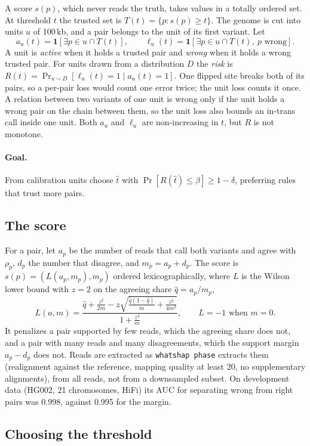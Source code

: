 \documentclass[11pt]{article}
\theoremstyle{definition}
\theoremstyle{remark}
\begin{document}
A score $s(p)$, which never reads the truth, takes values in a totally
ordered set. At threshold $t$ the trusted set is $T(t)=\{p:s(p)\ge t\}$. The
genome is cut into units $u$ of 100\,kb, and a pair belongs to the unit of
its first variant. Let
\[
a_u(t)=\mathbf{1}[\exists p\in u\cap T(t)],\qquad
\ell_u(t)=\mathbf{1}[\exists p\in u\cap T(t),\ p\text{ wrong}].
\]
A unit is \emph{active} when it holds a trusted pair and \emph{wrong} when it
holds a wrong trusted pair. For units drawn from a distribution $D$ the
\emph{risk} is $R(t)=\Pr_{u\sim D}[\ell_u(t)=1\mid a_u(t)=1]$. One flipped
site breaks both of its pairs, so a per-pair loss would count one error
twice; the unit loss counts it once. A relation between two variants of one
unit is wrong only if the unit holds a wrong pair on the chain between them,
so the unit loss also bounds an in-trans call inside one unit. Both $a_u$
and $\ell_u$ are non-increasing in $t$, but $R$ is not monotone.

\paragraph{Goal.} From calibration units choose $\hat t$ with
$\Pr[R(\hat t)\le\beta]\ge1-\delta$, preferring rules that trust more pairs.

\subsection{The score}\label{sec:score}

For a pair, let $a_p$ be the number of reads that call both variants and
agree with $\rho_p$, $d_p$ the number that disagree, and $m_p=a_p+d_p$. The
score is $s(p)=(L(a_p,m_p),m_p)$ ordered lexicographically, where $L$ is the
Wilson lower bound with $z=2$ on the agreeing share $\hat q=a_p/m_p$,
\[
L(a,m)=\frac{\hat q+\frac{z^2}{2m}-z\sqrt{\frac{\hat q(1-\hat q)}{m}+
\frac{z^2}{4m^2}}}{1+\frac{z^2}{m}},\qquad L=-1\text{ when }m=0.
\]
It penalizes a pair supported by few reads, which the agreeing share does
not, and a pair with many reads and many disagreements, which the support
margin $a_p-d_p$ does not. Reads are extracted as \texttt{whatshap phase}
extracts them (realignment against the reference, mapping quality at least
20, no supplementary alignments), from all reads, not from a downsampled
subset. On development data (HG002, 21 chromosomes, HiFi) its AUC for
separating wrong from right pairs was 0.998, against 0.995 for the margin.

\subsection{Choosing the threshold}\label{sec:ltt}
\end{document}
